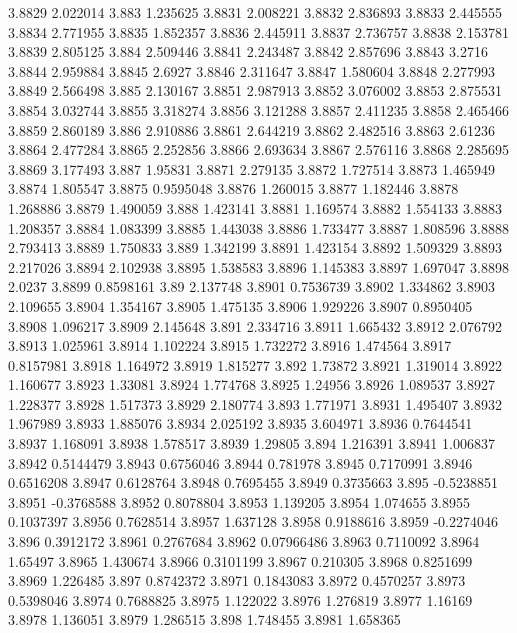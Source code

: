 3.8829  2.022014
3.883  1.235625
3.8831  2.008221
3.8832  2.836893
3.8833  2.445555
3.8834  2.771955
3.8835  1.852357
3.8836  2.445911
3.8837  2.736757
3.8838  2.153781
3.8839  2.805125
3.884  2.509446
3.8841  2.243487
3.8842  2.857696
3.8843  3.2716
3.8844  2.959884
3.8845  2.6927
3.8846  2.311647
3.8847  1.580604
3.8848  2.277993
3.8849  2.566498
3.885  2.130167
3.8851  2.987913
3.8852  3.076002
3.8853  2.875531
3.8854  3.032744
3.8855  3.318274
3.8856  3.121288
3.8857  2.411235
3.8858  2.465466
3.8859  2.860189
3.886  2.910886
3.8861  2.644219
3.8862  2.482516
3.8863  2.61236
3.8864  2.477284
3.8865  2.252856
3.8866  2.693634
3.8867  2.576116
3.8868  2.285695
3.8869  3.177493
3.887  1.95831
3.8871  2.279135
3.8872  1.727514
3.8873  1.465949
3.8874  1.805547
3.8875  0.9595048
3.8876  1.260015
3.8877  1.182446
3.8878  1.268886
3.8879  1.490059
3.888  1.423141
3.8881  1.169574
3.8882  1.554133
3.8883  1.208357
3.8884  1.083399
3.8885  1.443038
3.8886  1.733477
3.8887  1.808596
3.8888  2.793413
3.8889  1.750833
3.889  1.342199
3.8891  1.423154
3.8892  1.509329
3.8893  2.217026
3.8894  2.102938
3.8895  1.538583
3.8896  1.145383
3.8897  1.697047
3.8898  2.0237
3.8899  0.8598161
3.89  2.137748
3.8901  0.7536739
3.8902  1.334862
3.8903  2.109655
3.8904  1.354167
3.8905  1.475135
3.8906  1.929226
3.8907  0.8950405
3.8908  1.096217
3.8909  2.145648
3.891  2.334716
3.8911  1.665432
3.8912  2.076792
3.8913  1.025961
3.8914  1.102224
3.8915  1.732272
3.8916  1.474564
3.8917  0.8157981
3.8918  1.164972
3.8919  1.815277
3.892  1.73872
3.8921  1.319014
3.8922  1.160677
3.8923  1.33081
3.8924  1.774768
3.8925  1.24956
3.8926  1.089537
3.8927  1.228377
3.8928  1.517373
3.8929  2.180774
3.893  1.771971
3.8931  1.495407
3.8932  1.967989
3.8933  1.885076
3.8934  2.025192
3.8935  3.604971
3.8936  0.7644541
3.8937  1.168091
3.8938  1.578517
3.8939  1.29805
3.894  1.216391
3.8941  1.006837
3.8942  0.5144479
3.8943  0.6756046
3.8944  0.781978
3.8945  0.7170991
3.8946  0.6516208
3.8947  0.6128764
3.8948  0.7695455
3.8949  0.3735663
3.895  -0.5238851
3.8951  -0.3768588
3.8952  0.8078804
3.8953  1.139205
3.8954  1.074655
3.8955  0.1037397
3.8956  0.7628514
3.8957  1.637128
3.8958  0.9188616
3.8959  -0.2274046
3.896  0.3912172
3.8961  0.2767684
3.8962  0.07966486
3.8963  0.7110092
3.8964  1.65497
3.8965  1.430674
3.8966  0.3101199
3.8967  0.210305
3.8968  0.8251699
3.8969  1.226485
3.897  0.8742372
3.8971  0.1843083
3.8972  0.4570257
3.8973  0.5398046
3.8974  0.7688825
3.8975  1.122022
3.8976  1.276819
3.8977  1.16169
3.8978  1.136051
3.8979  1.286515
3.898  1.748455
3.8981  1.658365
